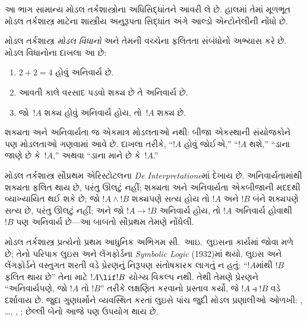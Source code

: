 
\label{guunit:OLP-0407}


\begin{editorial}
  આ ભાગ સામાન્ય મોડલ તર્કશાસ્ત્રોના અધિસિદ્ધાંતને આવરી લે છે.
  હાલમાં તેમાં મૂળભૂત મોડલ તર્કશાસ્ત્ર માટેના શાસ્ત્રીય
  અનુરૂપતા સિદ્ધાંત અંગે આલ્ડો એન્ટોનેલીની નોંધો છે.
\end{editorial}

\begingroup
\makeatletter{}\makeatother

\label{guunit:OLP-0408}


\begingroup
\makeatletter{}\makeatother


\label{guunit:OLP-0409}


મોડલ તર્કશાસ્ત્ર \emph{મોડલ વિધાનો} અને તેમની વચ્ચેના ફલિતતા
સંબંધોનો અભ્યાસ કરે છે. મોડલ વિધાનોના દાખલા આ છે:
\begin{enumerate}
\item $2+2=4$ હોવું અનિવાર્ય છે.
\item આવતી કાલે વરસાદ પડવો શક્ય છે તે અનિવાર્ય છે.
\item જો~$!A$ શક્ય હોવું અનિવાર્ય હોય, તો~$!A$
  શક્ય છે.
\end{enumerate}
શક્યતા અને અનિવાર્યતા જ એકમાત્ર મોડલતાઓ નથી:
બીજા એકસ્થાની સંયોજકોને પણ મોડલતાઓ ગણવામાં આવે છે.
દાખલા તરીકે, ``$!A$ હોવું જોઈએ,'' ``$!A$ થશે,''
``ડાના જાણે છે કે~$!A$,'' અથવા ``ડાના માને છે કે~$!A$.''

મોડલ તર્કશાસ્ત્ર સૌપ્રથમ એરિસ્ટોટલના \emph{De
  Interpretatione}માં દેખાય છે. અનિવાર્યતામાંથી શક્યતા
ફલિત થાય છે, પરંતુ ઊલટું નહીં; શક્યતા અને અનિવાર્યતા
એકબીજાની મદદથી વ્યાખ્યાયિત થઈ શકે છે; જો $!A \land !B$
શક્યપણે સત્ય હોય તો $!A$ અને $!B$ બંને શક્યપણે સત્ય છે,
પરંતુ ઊલટું નહીં; અને જો $!A \to !B$ અનિવાર્ય હોય,
તો $!A$ અનિવાર્ય હોવાથી~$!B$ પણ અનિવાર્ય છે---આ બાબતો
સૌપ્રથમ તેમણે નોંધેલી.

મોડલ તર્કશાસ્ત્ર પ્રત્યેનો પ્રથમ આધુનિક અભિગમ સી.~આઇ.~લુઇસના
કાર્યમાં જોવા મળે છે; તેનો પરિપાક લુઇસ અને લેંગફોર્ડના
\emph{Symbolic Logic} (1932)માં થયો. લુઇસ અને લેંગફોર્ડને
વસ્તુગત શરતી વડે પ્રેરણનું નિરૂપણ સંતોષકારક લાગતું ન હતું:
``$!A$માંથી $!B$ ફલિત થાય છે'' તેના માટે $!A \lif !B$
યોગ્ય વિકલ્પ નથી. તેથી તેમણે પ્રેરણને ``અનિવાર્યપણે,
જો $!A$ તો $!B$'' તરીકે લક્ષણિત કરવાનો પ્રસ્તાવ કર્યો,
જે $!A \strictif !B$ વડે દર્શાવાય છે. જુદા ગુણધર્મોને
વ્યવસ્થિત કરતાં લુઇસે પાંચ જુદી મોડલ પ્રણાલીઓ ઓળખી:
, \ldots, , ; છેલ્લી બેનો આજે પણ
ઉપયોગ થાય છે.

